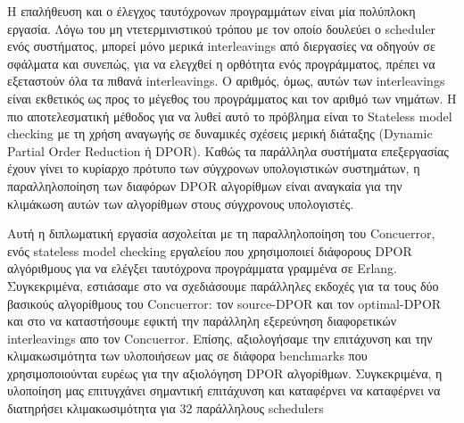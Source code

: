 Η επαλήθευση και ο έλεγχος ταυτόχρονων προγραμμάτων είναι μία πολύπλοκη εργασία. Λόγω του μη ντετερμινιστικού τρόπου με τον οποίο
δουλεύει ο scheduler ενός συστήματος, μπορεί μόνο μερικά interleavings από διεργασίες να οδηγούν σε σφάλματα και συνεπώς, 
για να ελεγχθεί η ορθότητα ενός προγράμματος, πρέπει να εξεταστούν όλα τα πιθανά interleavings. Ο αριθμός, όμως, αυτών των 
interleavings είναι εκθετικός ως προς το μέγεθος του προγράμματος και τον αριθμό των νημάτων. Η πιο αποτελεσματική μέθοδος για να λυθεί αυτό
το πρόβλημα είναι το Stateless model checking με τη χρήση αναγωγής σε δυναμικές
σχέσεις μερική διάταξης (Dynamic Partial Order Reduction ή DPOR). Καθώς τα παράλληλα συστήματα επεξεργασίας έχουν
γίνει το κυρίαρχο πρότυπο των σύγχρονων υπολογιστικών συστημάτων, η παραλληλοποίηση των διαφόρων DPOR αλγορίθμων είναι 
αναγκαία για την κλιμάκωση αυτών των αλγορίθμων στους σύγχρονους υπολογιστές.

Αυτή η διπλωματική εργασία ασχολείται με τη παραλληλοποίηση του Concuerror, ενός stateless model checking εργαλείου που χρησιμοποιεί
διάφορους DPOR αλγόριθμους για να ελέγξει ταυτόχρονα προγράμματα γραμμένα σε Erlang. Συγκεκριμένα, εστιάσαμε στο να σχεδιάσουμε 
παράλληλες εκδοχές για τα τους δύο βασικούς αλγορίθμους του Concuerror: τον source-DPOR και τον optimal-DPOR και στο
να καταστήσουμε εφικτή την παράλληλη εξερεύνηση διαφορετικών interleavings απο τον Concuerror.
Επίσης, αξιολογήσαμε την επιτάχυνση και την κλιμακωσιμότητα των υλοποιήσεων μας σε διάφορα benchmarks που 
χρησιμοποιούνται ευρέως για την αξιολόγηση DPOR αλγορίθμων. 
Συγκεκριμένα, η υλοποίηση μας επιτυγχάνει σημαντική επιτάχυνση και καταφέρνει να καταφέρνει να διατηρήσει κλιμακωσιμότητα για 32 παράλληλους schedulers


